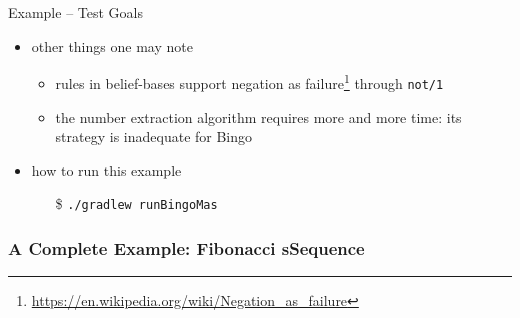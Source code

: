 \documentclass[presentation]{beamer}\mode<presentation>{\usetheme{AMSBolognaFC}}
\begin{document}
\begin{frame}[c, allowframebreaks]{Example \theJasonExample{} -- Test Goals}
\begin{itemize}
        \vspace{.3cm}
    
        \item other things one may note
        \begin{itemize}
            \item rules in \jason{} belief-bases support negation as failure\footnote{\url{https://en.wikipedia.org/wiki/Negation_as_failure}} through \texttt{not/1}
            \item the number extraction algorithm requires more and more time: its strategy is inadequate for Bingo
        \end{itemize}
        
        \vspace{.3cm}
        
        \item how to run this example
        \begin{itemize}
            \item[\$] \texttt{./gradlew run\alert{Bingo}Mas}
        \end{itemize}
        
    \end{itemize}
\end{frame}

\subsubsection{A Complete Example: Fibonacci sSequence}
\end{document}
